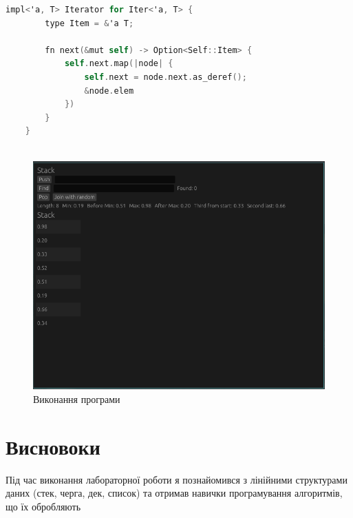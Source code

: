 \documentclass{article}
\begin{document}
\begin{normalsize}
\begin{lstlisting}[language=C]
	impl<'a, T> Iterator for Iter<'a, T> {
		type Item = &'a T;
		
		fn next(&mut self) -> Option<Self::Item> {
			self.next.map(|node| {
				self.next = node.next.as_deref();
				&node.elem
			})
		}
	}
			
		\end{lstlisting}
		
		\begin{figure}[H]
			\centering
			\includegraphics[scale=0.6]{1}	
			\caption{Виконання програми}
		\end{figure}
		
		\section*{Висновоки}
		Під час виконання лабораторної роботи я познайомився з лінійними структурами даних (стек, черга, дек, список) та отримав навички програмування алгоритмів, що їх обробляють
		
	\end{normalsize}
\end{document}
